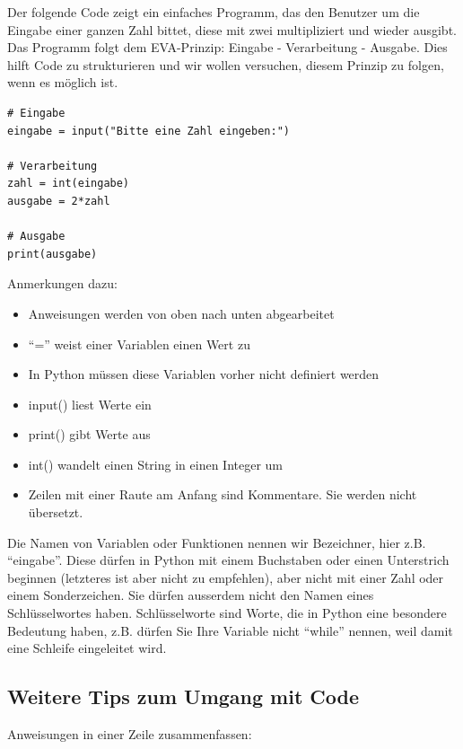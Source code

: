 \documentclass[
]{book}
\begin{document}
Der folgende Code zeigt ein einfaches Programm, das den Benutzer um die Eingabe einer ganzen Zahl bittet, diese mit zwei multipliziert und wieder ausgibt. Das Programm folgt dem EVA-Prinzip: Eingabe - Verarbeitung - Ausgabe. Dies hilft Code zu strukturieren und wir wollen versuchen, diesem Prinzip zu folgen, wenn es möglich ist.

\begin{verbatim}
# Eingabe
eingabe = input("Bitte eine Zahl eingeben:")

# Verarbeitung
zahl = int(eingabe)
ausgabe = 2*zahl

# Ausgabe
print(ausgabe)
\end{verbatim}

Anmerkungen dazu:

\begin{itemize}
\item
  Anweisungen werden von oben nach unten abgearbeitet
\item
  ``='' weist einer Variablen einen Wert zu
\item
  In Python müssen diese Variablen vorher nicht definiert werden
\item
  input() liest Werte ein
\item
  print() gibt Werte aus
\item
  int() wandelt einen String in einen Integer um
\item
  Zeilen mit einer Raute am Anfang sind Kommentare. Sie werden nicht übersetzt.
\end{itemize}

Die Namen von Variablen oder Funktionen nennen wir Bezeichner, hier z.B. ``eingabe''. Diese dürfen in Python mit einem Buchstaben oder einen Unterstrich beginnen (letzteres ist aber nicht zu empfehlen), aber nicht mit einer Zahl oder einem Sonderzeichen. Sie dürfen ausserdem nicht den Namen eines Schlüsselwortes haben. Schlüsselworte sind Worte, die in Python eine besondere Bedeutung haben, z.B. dürfen Sie Ihre Variable nicht ``while'' nennen, weil damit eine Schleife eingeleitet wird.

\hypertarget{weitere-tips-zum-umgang-mit-code}{%
\subsection*{Weitere Tips zum Umgang mit Code}\label{weitere-tips-zum-umgang-mit-code}}

Anweisungen in einer Zeile zusammenfassen:
\end{document}
